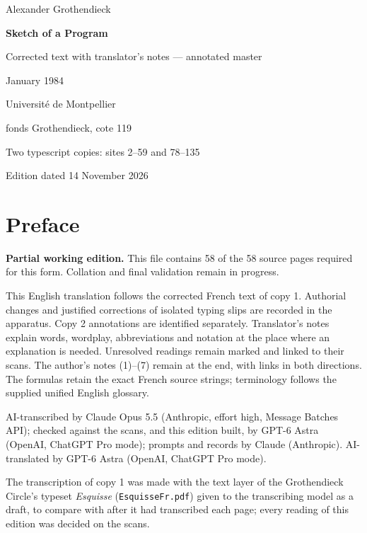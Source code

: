 \documentclass[11pt,a4paper]{article}
\newcommand{\EditionTitle}{Sketch of a Program}
\newcommand{\EditionForm}{Corrected text with translator’s notes — annotated master}
\begin{document}
\begin{titlepage}
\centering
\vspace*{18mm}
{\Large Alexander Grothendieck\par}
\vspace{12mm}
{\Huge\bfseries\EditionTitle\par}
\vspace{8mm}
{\Large\EditionForm\par}
\vspace{14mm}
{\large January 1984\par}
\vfill
{\large Université de Montpellier\par fonds Grothendieck, cote 119\par}
\vspace{8mm}
{\normalsize Two typescript copies: sites 2--59 and 78--135\par}
\vspace{8mm}
{\normalsize Edition dated 14 November 2026\par}
\end{titlepage}
\thispagestyle{plain}
\section*{Preface}
\noindent\textbf{Partial working edition.} This file contains 58 of the 58 source pages required for this form. Collation and final validation remain in progress.\par\smallskip
This English translation follows the corrected French text of copy 1. Authorial changes and justified corrections of isolated typing slips are recorded in the apparatus. Copy 2 annotations are identified separately. Translator’s notes explain words, wordplay, abbreviations and notation at the place where an explanation is needed. Unresolved readings remain marked and linked to their scans. The author’s notes (1)–(7) remain at the end, with links in both directions. The formulas retain the exact French source strings; terminology follows the supplied unified English glossary.

\smallskip
AI-transcribed by Claude Opus 5.5 (Anthropic, effort high, Message Batches API); checked against the scans, and this edition built, by GPT-6 Astra (OpenAI, ChatGPT Pro mode); prompts and records by Claude (Anthropic).
AI-translated by GPT-6 Astra (OpenAI, ChatGPT Pro mode).

The transcription of copy 1 was made with the text layer of the Grothendieck Circle's typeset \textit{Esquisse} (\texttt{EsquisseFr.pdf}) given to the transcribing model as a draft, to compare with after it had transcribed each page; every reading of this edition was decided on the scans.
\end{document}
